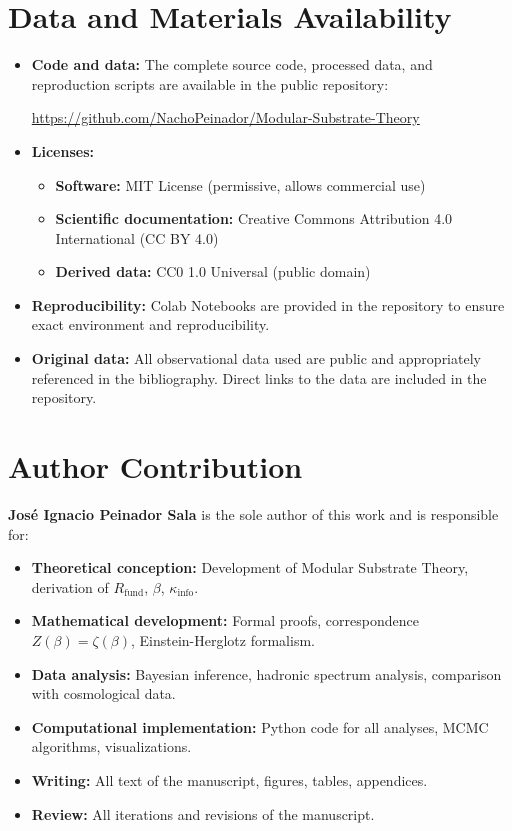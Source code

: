 \documentclass[11pt, a4paper]{article}
\theoremstyle{plain}
\theoremstyle{definition}
\newcommand{\Rfactor}{R_{\text{fund}}}
\newcommand{\Kinfo}{\kappa_{\text{info}}}
\begin{document}
\section*{Data and Materials Availability}

\begin{itemize}
    \item \textbf{Code and data:} The complete source code, processed data, and reproduction scripts are available in the public repository:
    \begin{center}
    \url{https://github.com/NachoPeinador/Modular-Substrate-Theory}
    \end{center}
    
    \item \textbf{Licenses:}
    \begin{itemize}
        \item \textbf{Software:} MIT License (permissive, allows commercial use)
        \item \textbf{Scientific documentation:} Creative Commons Attribution 4.0 International (CC BY 4.0)
        \item \textbf{Derived data:} CC0 1.0 Universal (public domain)
    \end{itemize}
    
    \item \textbf{Reproducibility:} Colab Notebooks are provided in the repository to ensure exact environment and reproducibility. 
    
    \item \textbf{Original data:} All observational data used are public and appropriately referenced in the bibliography. Direct links to the data are included in the repository.
\end{itemize}

\section*{Author Contribution}

\textbf{José Ignacio Peinador Sala} is the sole author of this work and is responsible for:

\begin{itemize}
    \item \textbf{Theoretical conception:} Development of Modular Substrate Theory, derivation of $\Rfactor$, $\beta$, $\Kinfo$.
    \item \textbf{Mathematical development:} Formal proofs, correspondence $Z(\beta)=\zeta(\beta)$, Einstein-Herglotz formalism.
    \item \textbf{Data analysis:} Bayesian inference, hadronic spectrum analysis, comparison with cosmological data.
    \item \textbf{Computational implementation:} Python code for all analyses, MCMC algorithms, visualizations.
    \item \textbf{Writing:} All text of the manuscript, figures, tables, appendices.
    \item \textbf{Review:} All iterations and revisions of the manuscript.
\end{itemize}
\end{document}
